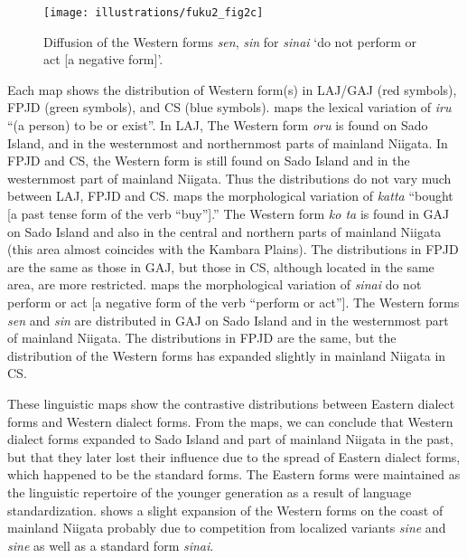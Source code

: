 \documentclass[output=paper]{LSP/langsci}
\begin{document}
\begin{figure}
\texttt{[image: illustrations/fuku2\_fig2c]}
\caption{Diffusion of the Western forms \textit{sen}, \textit{sin} for \textit{sinai} `do not perform or act [a negative form]'.}
\label{fig:2c}
\end{figure}

Each map shows the distribution of Western form(s) in LAJ/GAJ (red symbols), FPJD (green symbols), and CS (blue symbols).   maps the lexical variation of \textit{iru} “(a person) to be or exist”.  In LAJ, The Western form \textit{oru} is found on Sado Island, and in the westernmost and northernmost parts of mainland Niigata.  In FPJD and CS, the Western form is still found on Sado Island and in the westernmost part of mainland Niigata.  Thus the distributions do not vary much between LAJ, FPJD and CS.   maps the morphological variation of \textit{katta} “bought [a past tense form of the verb “buy”].”  The Western form \textit{ko
ta} is found in GAJ on Sado Island and also in the central and northern parts of mainland Niigata (this area almost coincides with the Kambara Plains).  The distributions in FPJD are the same as those in GAJ, but those in CS, although located in the same area, are more restricted.   maps the morphological variation of \textit{sinai} {\textquotedbl}do not perform or act [a negative form of the verb “perform or act”].{\textquotedbl} The Western forms \textit{sen} and \textit{sin} are distributed in GAJ on Sado Island and in the westernmost part of mainland Niigata. The distributions in FPJD are the same, but the distribution of the Western forms has expanded slightly  in mainland Niigata in CS.

These linguistic maps show the contrastive distributions between Eastern dialect forms and Western dialect forms.  From the maps, we can conclude that Western dialect forms expanded to Sado Island and part of mainland Niigata in the past, but that they later lost their influence due to the spread of Eastern dialect forms, which happened to be the standard forms. The Eastern forms were maintained as the linguistic repertoire of the younger generation as a result of language standardization.  shows a slight expansion of the Western forms on the coast of mainland Niigata probably due to  competition from localized variants \textit{sine} and \textit{sine
} as well as a standard form \textit{sinai}.  
\end{document}
